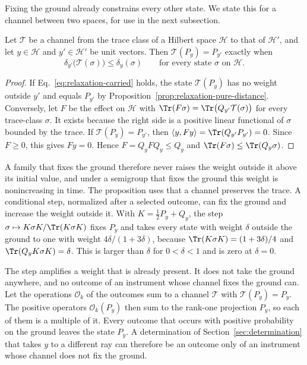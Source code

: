 Fixing the ground already constrains every other state. We state this for a channel between two spaces, for use in the next subsection.

\begin{proposition}
\label{prop:relaxation-carried}
Let $\mathcal T$ be a channel from the trace class of a Hilbert space $\mathcal H$ to that of $\mathcal H'$, and let $y\in\mathcal H$ and $y'\in\mathcal H'$ be unit vectors. Then $\mathcal T(P_y)=P_{y'}$ exactly when
\begin{equation}
 \delta_{y'}\bigl(\mathcal T(\sigma)\bigr)\le\delta_y(\sigma)\qquad\text{for every state $\sigma$ on $\mathcal H$.}
 \label{eq:relaxation-carried}
\end{equation}
\end{proposition}
\begin{proof}
If Eq.~\eqref{eq:relaxation-carried} holds, the state $\mathcal T(P_y)$ has no weight outside $y'$ and equals $P_{y'}$ by Proposition~\ref{prop:relaxation-pure-distance}. Conversely, let $F$ be the effect on $\mathcal H$ with $\Tr(F\sigma)=\Tr\bigl(Q_{y'}\mathcal T(\sigma)\bigr)$ for every trace-class $\sigma$. It exists because the right side is a positive linear functional of $\sigma$ bounded by the trace. If $\mathcal T(P_y)=P_{y'}$, then $\langle y,Fy\rangle=\Tr(Q_{y'}P_{y'})=0$. Since $F\ge0$, this gives $Fy=0$. Hence $F=Q_yFQ_y\le Q_y$ and $\Tr(F\sigma)\le\Tr(Q_y\sigma)$.
\end{proof}

A family that fixes the ground therefore never raises the weight outside it above its initial value, and under a semigroup that fixes the ground this weight is nonincreasing in time. The proposition uses that a channel preserves the trace. A conditional step, normalized after a selected outcome, can fix the ground and increase the weight outside it. With $K=\tfrac12P_y+Q_y$, the step $\sigma\mapsto K\sigma K/\Tr(K\sigma K)$ fixes $P_y$ and takes every state with weight $\delta$ outside the ground to one with weight $4\delta/(1+3\delta)$, because $\Tr(K\sigma K)=(1+3\delta)/4$ and $\Tr(Q_yK\sigma K)=\delta$. This is larger than $\delta$ for $0<\delta<1$ and is zero at $\delta=0$.

The step amplifies a weight that is already present. It does not take the ground anywhere, and no outcome of an instrument whose channel fixes the ground can. Let the operations $\mathcal O_k$ of the outcomes sum to a channel $\mathcal T$ with $\mathcal T(P_y)=P_y$. The positive operators $\mathcal O_k(P_y)$ then sum to the rank-one projection $P_y$, so each of them is a multiple of it. Every outcome that occurs with positive probability on the ground leaves the state $P_y$. A determination of Section~\ref{sec:determination} that takes $y$ to a different ray can therefore be an outcome only of an instrument whose channel does not fix the ground.

